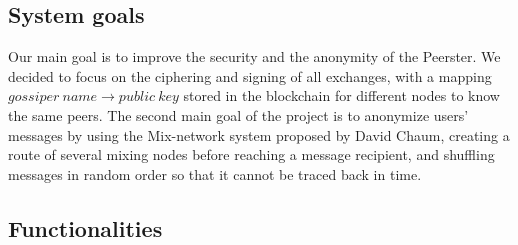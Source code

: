 \documentclass[11pt, a4paper]{article}
\begin{document}
    \subsection{System goals}\label{subsec:system-goals}

        Our main goal is to improve the security and the anonymity of the Peerster.
        We decided to focus on the ciphering and signing of all exchanges, with a mapping $gossiper~name \rightarrow public~key$ stored in the blockchain for different nodes to know the same peers.
        The second main goal of the project is to anonymize users' messages by using the Mix-network system proposed by David Chaum\cite{chaum84}, creating a route of several mixing nodes before reaching a message recipient, and shuffling messages in random order so that it cannot be traced back in time.

    \subsection{Functionalities}\label{subsec:functionalities}
\end{document}
